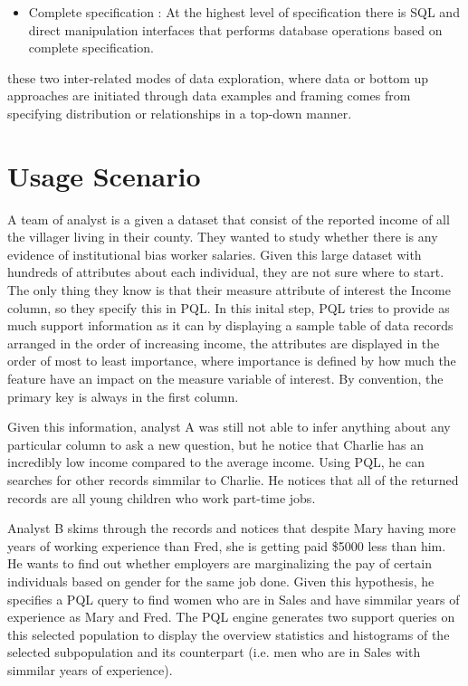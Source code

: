 \documentclass{sig-alternate-05-2015}
\begin{document}
\begin{itemize}
\item Complete specification : At the highest level of specification there is SQL and direct manipulation interfaces that performs database operations based on complete specification.
\end{itemize}
these two inter-related modes of data exploration, where data or bottom up approaches are initiated through data examples and framing comes from specifying distribution or relationships in a top-down manner.
\section{Usage Scenario}
\par A team of analyst is a given a dataset that consist of the reported income of all the villager living in their county. They wanted to study whether there is any evidence of institutional bias worker salaries. Given this large dataset with hundreds of attributes about each individual, they are not sure where to start. The only thing they know is that their measure attribute of interest the Income column, so they specify this in PQL. In this inital step, PQL tries to provide as much support information as it can by displaying a sample table of data records arranged in the order of increasing income, the attributes are displayed in the order of most to least importance, where importance is defined by how much the feature have an impact on the measure variable of interest. By convention, the primary key is always in the first column. 
\par Given this information, analyst A was still not able to infer anything about any particular column to ask a new question, but he notice that Charlie has an incredibly low income compared to the average income. Using PQL, he can searches for other records simmilar to Charlie. He notices that all of the returned records are all young children who work part-time jobs.
\par Analyst B skims through the records  and notices that despite Mary having more years of working experience than Fred, she is getting paid \$5000 less than him. He wants to find out whether employers are marginalizing the pay of certain individuals based on gender for the same job done. Given this hypothesis, he specifies a PQL query to find women who are in Sales and have simmilar years of experience as Mary and Fred. The PQL engine generates two support queries on this selected population to display the overview statistics and histograms of the selected subpopulation and its counterpart (i.e. men who are in Sales with simmilar years of experience).
\end{document}
